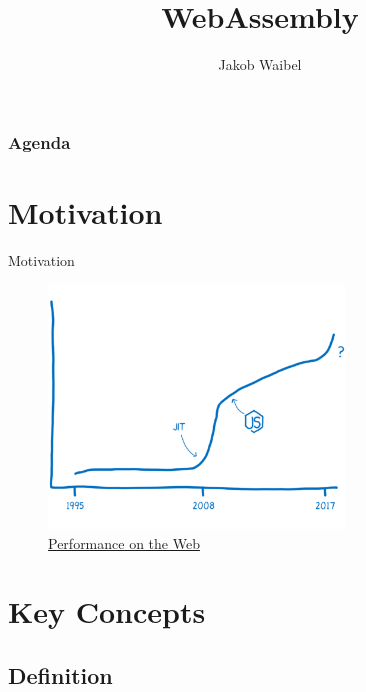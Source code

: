 \documentclass{beamer}
\title[WebAssembly]{WebAssembly}
\author{Jakob Waibel}
\institute[Jakob Waibel]{MI7 Druck und Medien}
\date
\begin{document}
\begin{frame}
    \titlepage
\end{frame}

\begin{frame}
    \frametitle{Agenda}
    \begin{multicols}{2}
    \tableofcontents
    \end{multicols}
\end{frame}

\section{Motivation}

\begin{frame}{Motivation}
    \begin{figure}
        \includegraphics[width=0.7\textwidth,height=0.7\textheight]{./images/perf_history.png}
        \caption{\href{https://hacks.mozilla.org/2017/02/a-cartoon-intro-to-webassembly/}{Performance on the Web}}
    \end{figure}
\end{frame}

\section{Key Concepts} 

\subsection{Definition}
\end{document}
